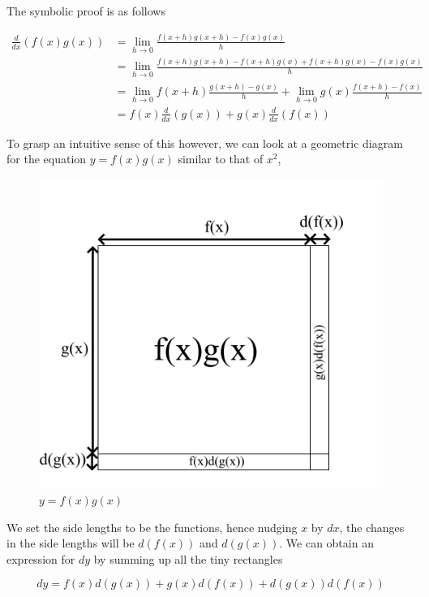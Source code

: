 \documentclass[a4paper,12pt,oneside]{book}
\begin{document}
\noindent The symbolic proof is as follows

$$
\begin{aligned}
\frac{d}{dx}(f(x)g(x))&=\lim_{h\to 0}\frac{f(x+h)g(x+h)-f(x)g(x)}{h}\\
&=\lim_{h\to 0}\frac{{f({x+h})g({x+h})-f({x+h})g(x)+f({x+h})g(x)-f(x)g(x)}}{h}\\
&=\lim_{h\to 0}f(x+h)\frac{g(x+h)-g(x)}{h}+\lim_{h\to 0}g(x)\frac{f(x+h)-f(x)}{h}\\
&=f(x)\frac{d}{dx}(g(x))+g(x)\frac{d}{dx}(f(x))
\end{aligned}
$$

\noindent To grasp an intuitive sense of this however, we can look at a geometric diagram for the equation $y=f(x)g(x)$ similar to that of $x^2$,

\begin{figure}[H]
    \begin{center}
        \includegraphics[scale=0.35]{img/zayan/prodrule.png}
        \caption{$y=f(x)g(x)$}
        \label{fig:prodrule}
    \end{center}
\end{figure}

\noindent We set the side lengths to be the functions, hence nudging $x$ by $dx$, the changes in the side lengths will be $d(f(x))$ and $d(g(x))$. We can obtain an expression for $dy$ by summing up all the tiny rectangles

$$dy=f(x)d(g(x))+g(x)d(f(x))+d(g(x))d(f(x))$$
\end{document}
